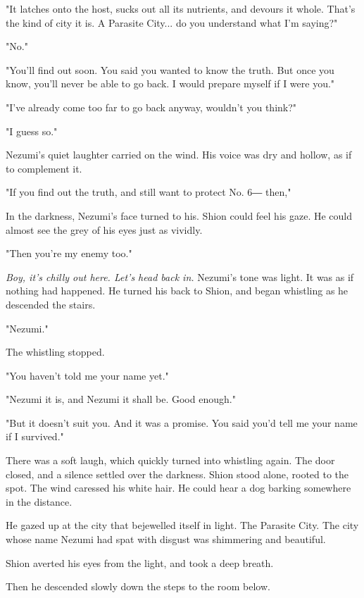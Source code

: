 "It latches onto the host, sucks out all its nutrients, and devours it
whole. That's the kind of city it is. A Parasite City... do you
understand what I'm saying?"

"No."

"You'll find out soon. You said you wanted to know the truth. But once
you know, you'll never be able to go back. I would prepare myself if I
were you."

"I've already come too far to go back anyway, wouldn't you think?"

"I guess so."

Nezumi's quiet laughter carried on the wind. His voice was dry and
hollow, as if to complement it.

"If you find out the truth, and still want to protect No. 6― then,"

In the darkness, Nezumi's face turned to his. Shion could feel his gaze.
He could almost see the grey of his eyes just as vividly.~

"Then you're my enemy too."

\emph{Boy, it's chilly out here. Let's head back in.} Nezumi's tone was light.
It was as if nothing had happened. He turned his back to Shion, and
began whistling as he descended the stairs.

"Nezumi."

The whistling stopped.

"You haven't told me your name yet."

"Nezumi it is, and Nezumi it shall be. Good enough."

"But it doesn't suit you. And it was a promise. You said you'd tell me
your name if I survived."

There was a soft laugh, which quickly turned into whistling again. The
door closed, and a silence settled over the darkness. Shion stood alone,
rooted to the spot. The wind caressed his white hair. He could hear a
dog barking somewhere in the distance.

He gazed up at the city that bejewelled itself in light. The Parasite
City. The city whose name Nezumi had spat with disgust was shimmering
and beautiful.

Shion averted his eyes from the light, and took a deep breath.

Then he descended slowly down the steps to the room below.